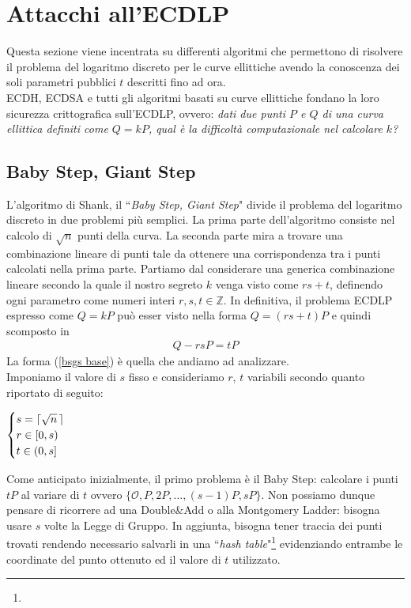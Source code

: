 \documentclass[a4paper,12pt]{tesiinfo}
\DeclarePairedDelimiter\ceil{\lceil}{\rceil}
\renewcommand{\footnotesize}{\fontsize{9pt}{11pt}\selectfont}
\begin{document}
\section{Attacchi all'ECDLP}
Questa sezione viene incentrata su differenti algoritmi che permettono di risolvere il problema del logaritmo discreto per le curve ellittiche avendo la conoscenza dei soli parametri pubblici $t$ descritti fino ad ora.
\\
ECDH, ECDSA e tutti gli algoritmi basati su curve ellittiche fondano la loro sicurezza crittografica sull'ECDLP, ovvero: \emph{dati due punti $P$ e $Q$ di una curva ellittica definiti come $Q = kP$, qual \`e la difficolt\`a computazionale nel calcolare $k$?}
%
%
%
%
%
%
%
%
%
%
%
\subsection{Baby Step, Giant Step}
L'algoritmo di Shank, il ``\textit{Baby Step, Giant Step}" divide il problema del logaritmo discreto in due problemi pi\`u semplici. La prima parte dell'algoritmo consiste nel calcolo di $\sqrt{n}$ punti della curva. La seconda parte mira a trovare una combinazione lineare di punti tale da ottenere una corrispondenza tra i punti calcolati nella prima parte. Partiamo dal considerare una generica combinazione lineare secondo la quale il nostro segreto $k$ venga visto come $rs+t$, definendo ogni parametro come numeri interi $r, s, t \in \mathbb{Z}$. In definitiva, il problema ECDLP espresso come $Q=kP$ pu\`o esser visto nella forma $Q = (rs+t)P$ e quindi scomposto in
\begin{gather}
 Q -rsP = tP \label{bsgs base}
\end{gather}
La forma (\ref{bsgs base}) \`e quella che andiamo ad analizzare.
\\
Imponiamo il valore di $s$ fisso e consideriamo $r$, $t$ variabili secondo quanto riportato di seguito:
\begin{center}$
\begin{cases}
 s=\ceil{\sqrt{n} \,}\\
 r \in [0, s)\\
 t \in (0, s]
\end{cases}$
\end{center}
Come anticipato inizialmente, il primo problema \`e il Baby Step: calcolare i punti $tP$ al variare di $t$ ovvero $\{\mathcal{O}, P, 2P, \ldots, (s-1)P, sP\}$. Non possiamo dunque pensare di ricorrere ad una Double\&Add o alla Montgomery Ladder: bisogna usare $s$ volte la Legge di Gruppo. In aggiunta, bisogna tener traccia dei punti trovati rendendo necessario salvarli in una ``\textit{hash table}"\footnote{\footnotesize{Matrice data da array associativi. Nel nostro caso le chiavi di tali array sono i valori computati di $t$; i valori degli array sono le coordinate di ciascun punto ottenuto.}} evidenziando entrambe le coordinate del punto ottenuto ed il valore di $t$ utilizzato.
\end{document}
